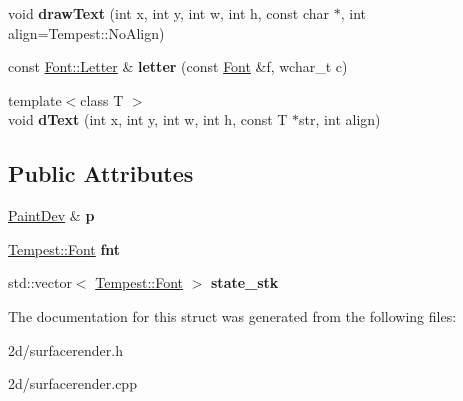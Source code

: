 \begin{DoxyCompactItemize}
\item 
\hypertarget{struct_tempest_1_1_surface_render_1_1_text_engine_a9a99eebb9ac95524d018be4dc14b7022}{void {\bfseries draw\+Text} (int x, int y, int w, int h, const char $\ast$, int align=Tempest\+::\+No\+Align)}\label{struct_tempest_1_1_surface_render_1_1_text_engine_a9a99eebb9ac95524d018be4dc14b7022}

\item 
\hypertarget{struct_tempest_1_1_surface_render_1_1_text_engine_aee4c454cff8ae17bfa4eea613bde1443}{const \hyperlink{struct_tempest_1_1_font_element_1_1_letter}{Font\+::\+Letter} \& {\bfseries letter} (const \hyperlink{class_tempest_1_1_font}{Font} \&f, wchar\+\_\+t c)}\label{struct_tempest_1_1_surface_render_1_1_text_engine_aee4c454cff8ae17bfa4eea613bde1443}

\item 
\hypertarget{struct_tempest_1_1_surface_render_1_1_text_engine_ae6b188fcac79024703914eca727b6850}{{\footnotesize template$<$class T $>$ }\\void {\bfseries d\+Text} (int x, int y, int w, int h, const T $\ast$str, int align)}\label{struct_tempest_1_1_surface_render_1_1_text_engine_ae6b188fcac79024703914eca727b6850}

\end{DoxyCompactItemize}
\subsection*{Public Attributes}
\begin{DoxyCompactItemize}
\item 
\hypertarget{struct_tempest_1_1_surface_render_1_1_text_engine_aeae91e454f56ac382096bcbb64927045}{\hyperlink{struct_tempest_1_1_surface_render_1_1_paint_dev}{Paint\+Dev} \& {\bfseries p}}\label{struct_tempest_1_1_surface_render_1_1_text_engine_aeae91e454f56ac382096bcbb64927045}

\item 
\hypertarget{struct_tempest_1_1_surface_render_1_1_text_engine_adcc3ba5ccca789f1cf4a9f2ce857e95b}{\hyperlink{class_tempest_1_1_font}{Tempest\+::\+Font} {\bfseries fnt}}\label{struct_tempest_1_1_surface_render_1_1_text_engine_adcc3ba5ccca789f1cf4a9f2ce857e95b}

\item 
\hypertarget{struct_tempest_1_1_surface_render_1_1_text_engine_a5db7ee52d7b567ea85bb4df8b21f02a0}{std\+::vector$<$ \hyperlink{class_tempest_1_1_font}{Tempest\+::\+Font} $>$ {\bfseries state\+\_\+stk}}\label{struct_tempest_1_1_surface_render_1_1_text_engine_a5db7ee52d7b567ea85bb4df8b21f02a0}

\end{DoxyCompactItemize}


The documentation for this struct was generated from the following files\+:\begin{DoxyCompactItemize}
\item 
2d/surfacerender.\+h\item 
2d/surfacerender.\+cpp\end{DoxyCompactItemize}
